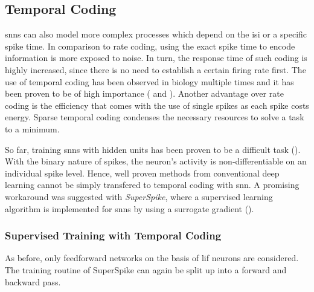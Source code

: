 \pagebreak
\subsection{Temporal Coding}
\label{temporalcoding}
\glspl{snn} can also model more complex processes which depend on the \gls{isi} or a specific spike time. In comparison to rate coding, using the exact spike time to encode information is more exposed to noise. In turn, the response time of such coding is highly increased, since there is no need to establish a certain firing rate first. The use of temporal coding has been observed in biology multiple times and it has been proven to be of high importance (\citealp{gerstner1996neuronal} and \citealp{rieke1999spikes}). Another advantage over rate coding is the efficiency that comes with the use of single spikes as each spike costs energy. Sparse temporal coding condenses the necessary resources to solve a task to a minimum.

So far, training \glspl{snn} with hidden units has been proven to be a difficult task (\citealp{pfeiffer2018deep}). With the binary nature of spikes, the neuron's activity is non-differentiable on an individual spike level. Hence, well proven methods from conventional deep learning cannot be simply transfered to temporal coding with \gls{snn}. A promising workaround was suggested with \emph{SuperSpike}, where a supervised learning algorithm is implemented for \glspl{snn} by using a surrogate gradient (\citealp{zenke2018superspike}).

\subsubsection*{Supervised Training with Temporal Coding}

As before, only feedforward networks on the basis of \gls{lif} neurons are considered. The training routine of SuperSpike can again be split up into a forward and backward pass.


